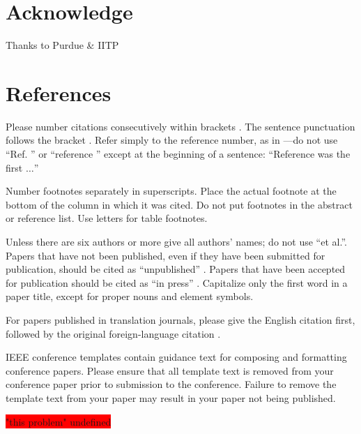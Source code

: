 \documentclass[conference]{IEEEtran}
\begin{document}
\section{Acknowledge}
Thanks to Purdue \& IITP
\section*{References}

Please number citations consecutively within brackets \cite{b1}. The 
sentence punctuation follows the bracket \cite{b2}. Refer simply to the reference 
number, as in \cite{b3}---do not use ``Ref. \cite{b3}'' or ``reference \cite{b3}'' except at 
the beginning of a sentence: ``Reference \cite{b3} was the first $\ldots$''

Number footnotes separately in superscripts. Place the actual footnote at 
the bottom of the column in which it was cited. Do not put footnotes in the 
abstract or reference list. Use letters for table footnotes.

Unless there are six authors or more give all authors' names; do not use 
``et al.''. Papers that have not been published, even if they have been 
submitted for publication, should be cited as ``unpublished'' \cite{b4}. Papers 
that have been accepted for publication should be cited as ``in press'' \cite{b5}. 
Capitalize only the first word in a paper title, except for proper nouns and 
element symbols.

For papers published in translation journals, please give the English 
citation first, followed by the original foreign-language citation \cite{b6}.

\begin{thebibliography}{00}


\end{thebibliography}
\vspace{12pt}
\color{red}
IEEE conference templates contain guidance text for composing and formatting conference papers. Please ensure that all template text is removed from your conference paper prior to submission to the conference. Failure to remove the template text from your paper may result in your paper not being published.

\colorbox{red}{"this problem" undefined}
\end{document}
